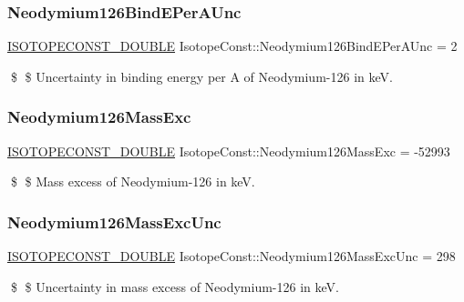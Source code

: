\subsubsection{\texorpdfstring{Neodymium126\+Bind\+E\+Per\+A\+Unc}{Neodymium126BindEPerAUnc}}
{\footnotesize\ttfamily \mbox{\hyperlink{group___isotope_const-_macros_ga8f45a7272ce02c0b4c65c44636ed719a}{I\+S\+O\+T\+O\+P\+E\+C\+O\+N\+S\+T\+\_\+\+D\+O\+U\+B\+LE}} Isotope\+Const\+::\+Neodymium126\+Bind\+E\+Per\+A\+Unc = 2}

\$ \$ Uncertainty in binding energy per A of Neodymium-\/126 in keV. \mbox{\label{group___isotope_const-_neodymium-_nd126_gad9904220af0985237cf0c87e26e35e30}} 
\subsubsection{\texorpdfstring{Neodymium126\+Mass\+Exc}{Neodymium126MassExc}}
{\footnotesize\ttfamily \mbox{\hyperlink{group___isotope_const-_macros_ga8f45a7272ce02c0b4c65c44636ed719a}{I\+S\+O\+T\+O\+P\+E\+C\+O\+N\+S\+T\+\_\+\+D\+O\+U\+B\+LE}} Isotope\+Const\+::\+Neodymium126\+Mass\+Exc = -\/52993}

\$ \$ Mass excess of Neodymium-\/126 in keV. \mbox{\label{group___isotope_const-_neodymium-_nd126_ga2728775aba01960e3624e4e19f54a7bd}} 
\subsubsection{\texorpdfstring{Neodymium126\+Mass\+Exc\+Unc}{Neodymium126MassExcUnc}}
{\footnotesize\ttfamily \mbox{\hyperlink{group___isotope_const-_macros_ga8f45a7272ce02c0b4c65c44636ed719a}{I\+S\+O\+T\+O\+P\+E\+C\+O\+N\+S\+T\+\_\+\+D\+O\+U\+B\+LE}} Isotope\+Const\+::\+Neodymium126\+Mass\+Exc\+Unc = 298}

\$ \$ Uncertainty in mass excess of Neodymium-\/126 in keV. \mbox{\label{group___isotope_const-_neodymium-_nd126_ga8db7836ed2ccc0049bd75f36758b4564}} 
